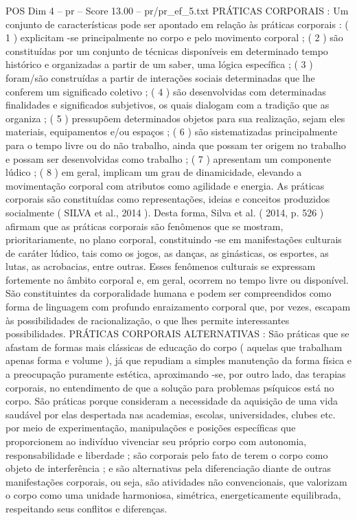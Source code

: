 \begin{textsample}{POS Dim 4 – pr – Score 13.00 – pr/pr\_ef\_5.txt}
PRÁTICAS CORPORAIS : Um conjunto de características pode ser apontado em relação às práticas corporais : ( 1 ) explicitam -se principalmente no corpo e pelo movimento corporal ; ( 2 ) são constituídas por um conjunto de técnicas disponíveis em determinado tempo histórico e organizadas a partir de um saber, uma lógica específica ; ( 3 ) foram/são construídas a partir de interações sociais determinadas que lhe conferem um significado coletivo ; ( 4 ) são desenvolvidas com determinadas finalidades e significados subjetivos, os quais dialogam com a tradição que as organiza ; ( 5 ) pressupõem determinados objetos para sua realização, sejam eles materiais, equipamentos e/ou espaços ; ( 6 ) são sistematizadas principalmente para o tempo livre ou do não trabalho, ainda que possam ter origem no trabalho e possam ser desenvolvidas como trabalho ; ( 7 ) apresentam um componente lúdico ; ( 8 ) em geral, implicam um grau de dinamicidade, elevando a movimentação corporal com atributos como agilidade e energia.
As práticas corporais são constituídas como representações, ideias e conceitos produzidos socialmente ( SILVA et al., 2014 ).
Desta forma, Silva et al. ( 2014, p. 526 ) afirmam que as práticas corporais são fenômenos que se mostram, prioritariamente, no plano corporal, constituindo -se em manifestações culturais de caráter lúdico, tais como os jogos, as danças, as ginásticas, os esportes, as lutas, as acrobacias, entre outras.
Esses fenômenos culturais se expressam fortemente no âmbito corporal e, em geral, ocorrem no tempo livre ou disponível.
São constituintes da corporalidade humana e podem ser compreendidos como forma de linguagem com profundo enraizamento corporal que, por vezes, escapam às possibilidades de racionalização, o que lhes permite interessantes possibilidades.
PRÁTICAS CORPORAIS ALTERNATIVAS : São práticas que se afastam de formas mais clássicas de educação do corpo ( aquelas que trabalham apenas forma e volume ), já que repudiam a simples manutenção da forma física e a preocupação puramente estética, aproximando -se, por outro lado, das terapias corporais, no entendimento de que a solução para problemas psíquicos está no corpo.
São práticas porque consideram a necessidade da aquisição de uma vida saudável por elas despertada nas academias, escolas, universidades, clubes etc. por meio de experimentação, manipulações e posições específicas que proporcionem ao indivíduo vivenciar seu próprio corpo com autonomia, responsabilidade e liberdade ; são corporais pelo fato de terem o corpo como objeto de interferência ; e são alternativas pela diferenciação diante de outras manifestações corporais, ou seja, são atividades não convencionais, que valorizam o corpo como uma unidade harmoniosa, simétrica, energeticamente equilibrada, respeitando seus conflitos e diferenças.

\end{textsample}
